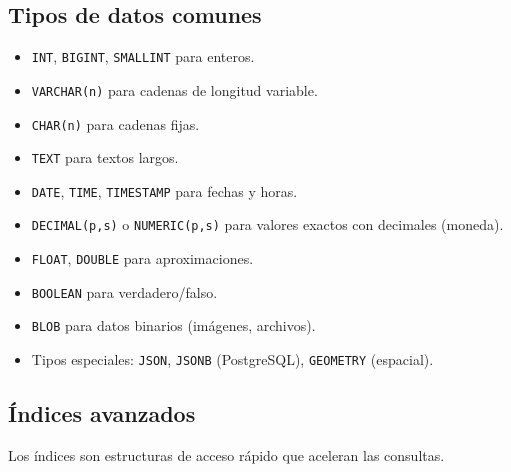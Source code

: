 \documentclass[12pt,a4paper,openany,oneside]{book}
\begin{document}
\subsection{Tipos de datos comunes}
\begin{itemize}
    \item \texttt{INT}, \texttt{BIGINT}, \texttt{SMALLINT} para enteros.
    \item \texttt{VARCHAR(n)} para cadenas de longitud variable.
    \item \texttt{CHAR(n)} para cadenas fijas.
    \item \texttt{TEXT} para textos largos.
    \item \texttt{DATE}, \texttt{TIME}, \texttt{TIMESTAMP} para fechas y horas.
    \item \texttt{DECIMAL(p,s)} o \texttt{NUMERIC(p,s)} para valores exactos con decimales (moneda).
    \item \texttt{FLOAT}, \texttt{DOUBLE} para aproximaciones.
    \item \texttt{BOOLEAN} para verdadero/falso.
    \item \texttt{BLOB} para datos binarios (imágenes, archivos).
    \item Tipos especiales: \texttt{JSON}, \texttt{JSONB} (PostgreSQL), \texttt{GEOMETRY} (espacial).
\end{itemize}

\subsection{Índices avanzados}
Los índices son estructuras de acceso rápido que aceleran las consultas.
\end{document}
